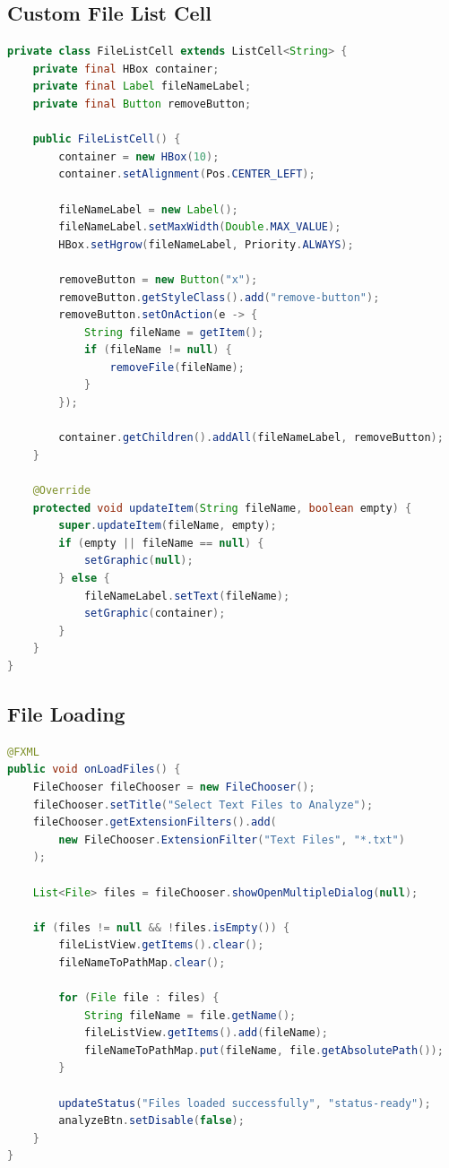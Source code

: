 \documentclass[12pt,a4paper]{report}
\begin{document}
\subsection{Custom File List Cell}
\begin{lstlisting}[language=Java, caption=Custom ListCell Implementation]
private class FileListCell extends ListCell<String> {
    private final HBox container;
    private final Label fileNameLabel;
    private final Button removeButton;
    
    public FileListCell() {
        container = new HBox(10);
        container.setAlignment(Pos.CENTER_LEFT);
        
        fileNameLabel = new Label();
        fileNameLabel.setMaxWidth(Double.MAX_VALUE);
        HBox.setHgrow(fileNameLabel, Priority.ALWAYS);
        
        removeButton = new Button("x");
        removeButton.getStyleClass().add("remove-button");
        removeButton.setOnAction(e -> {
            String fileName = getItem();
            if (fileName != null) {
                removeFile(fileName);
            }
        });
        
        container.getChildren().addAll(fileNameLabel, removeButton);
    }
    
    @Override
    protected void updateItem(String fileName, boolean empty) {
        super.updateItem(fileName, empty);
        if (empty || fileName == null) {
            setGraphic(null);
        } else {
            fileNameLabel.setText(fileName);
            setGraphic(container);
        }
    }
}
\end{lstlisting}

\subsection{File Loading}
\begin{lstlisting}[language=Java, caption=File Loading with FileChooser]
@FXML
public void onLoadFiles() {
    FileChooser fileChooser = new FileChooser();
    fileChooser.setTitle("Select Text Files to Analyze");
    fileChooser.getExtensionFilters().add(
        new FileChooser.ExtensionFilter("Text Files", "*.txt")
    );

    List<File> files = fileChooser.showOpenMultipleDialog(null);

    if (files != null && !files.isEmpty()) {
        fileListView.getItems().clear();
        fileNameToPathMap.clear();
        
        for (File file : files) {
            String fileName = file.getName();
            fileListView.getItems().add(fileName);
            fileNameToPathMap.put(fileName, file.getAbsolutePath());
        }

        updateStatus("Files loaded successfully", "status-ready");
        analyzeBtn.setDisable(false);
    }
}
\end{lstlisting}
\end{document}
